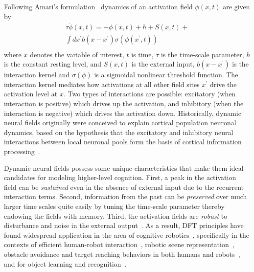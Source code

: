 Following Amari's formulation~\cite{amari1977dynamics} dynamics of an activation field $\phi(x, t)$ are given by 
\begin{multline*}
\tau\dot{\phi}(x,t) = -\phi(x,t) + h + S(x,t) + \\ \int\limits_{}^{}dx^{\prime}b(x-x^{\prime})\sigma(\phi(x^{\prime}, t)) 
\end{multline*} 
where $x$ denotes the variable of interest, $t$ is time, $\tau$ is the time-scale parameter, $h$ is the constant resting level, and $S(x,t)$ is the external input, $b(x-x^\prime)$ is the interaction kernel and $\sigma(\phi)$ is a sigmoidal nonlinear threshold function. The interaction kernel mediates how activations at all other field sites $x^\prime$ drive the activation level at $x$. Two types of interactions are possible: excitatory (when interaction is positive) which drives up the activation, and inhibitory (when the interaction is negative) which drives the activation down. 
Historically, dynamic neural fields originally were conceived to explain cortical population neuronal dynamics, based on the hypothesis that the excitatory and inhibitory neural interactions between local neuronal pools form the basis of cortical information processing~\cite{wilson1973mathematical}. 

Dynamic neural fields possess some unique characteristics that make them ideal candidates for modeling higher-level cognition. First, a peak in the activation field can be \textit{sustained} even in the absence of external input due to the recurrent interaction terms. Second, information from the past can be \textit{preserved} over much larger time scales quite easily by tuning the time-scale parameter thereby endowing the fields with memory. Third, the activation fields are \textit{robust} to disturbance and noise in the external output~\cite{schoner2008dynamical}. 
As a result, DFT principles have found widespread application in the area of cognitive robotics~\cite{erlhagen2006dynamic}, specifically in the contexts of efficient human-robot interaction~\cite{erlhagen2014dynamic}, robotic scene representation~\cite{zibner2011dynamic}, obstacle avoidance and target reaching behaviors in both humans and robots~\cite{schoner1995dynamics}, and for object learning and recognition~\cite{faubel2008learning}. 


